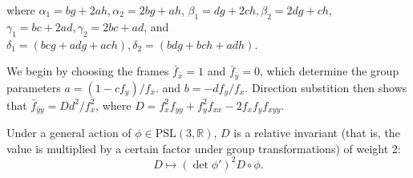 \documentclass[review,onefignum,onetabnum]{siamonline190516}
\def\R{\mathbb{R}}
\begin{document}
{\noindent where $\alpha_1 = b g + 2 a h, \alpha_2 = 2 b g + a h$, $\beta_1 = d g + 2 c h, \beta_2 = 2 d g + c h$, $\gamma_1 = b c + 2 a d, \gamma_2= 2 b c + a d$, and $\delta_1 = (b c g+a d g+a c h), \delta_2 = (b d g+b c h+a d h)$.


We begin by choosing the frames $\bar f_{\bar x} = 1$ and $\bar f_{\bar y}=  0$, which determine the group parameters $a = (1-c f_y)/f_x.$ and $b = -d f_y/f_x$. Direction substition then shows that $\bar f_{\bar y \bar y} = D d^2 / f_x^2$, where $D = f_{x}^2 f_{yy} + f_y^2 f_{xx} - 2 f_x f_y f_{xyy}$. 

Under a general action of $\phi \in \mathrm{PSL}(3,\R)$, $D$ is a relative invariant (that is, the value is multiplied by a certain factor under group transformations) of weight 2:
\begin{equation}
\label{eq:D}
D \mapsto (\det \phi')^2 D\circ \phi.
\end{equation}

}
\end{document}
